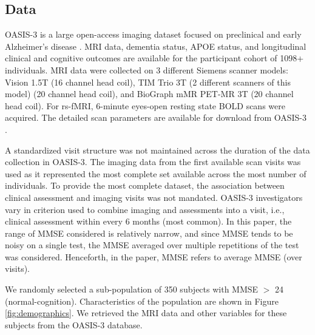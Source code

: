 \documentclass[review,3p,times,12pt,letterpaper]{elsarticle}
\newcommand{\dws}[1]{{\color{red} [#1]}}
\begin{document}
\subsection*{Data}
OASIS-3 is a large open-access imaging dataset focused on preclinical and early Alzheimer's disease \cite{lamontagne2019oasis, OASIS-3}. MRI data, dementia status, APOE status, and longitudinal clinical and cognitive outcomes are available for the participant cohort of 1098+ individuals. MRI data were collected on 3 different Siemens scanner models: Vision 1.5T (16 channel head coil), TIM Trio 3T (2 different scanners of this model) (20 channel head coil), and BioGraph mMR PET-MR 3T (20 channel head coil). For rs-fMRI, 6-minute eyes-open resting state BOLD scans were acquired. The detailed scan parameters are available for download from OASIS-3 \cite{lamontagne2019oasis, OASIS-3}.
 

A standardized visit structure was not maintained across the duration of the data collection in OASIS-3. The imaging data from the first available scan visits was used as it represented the most complete set available across the most number of individuals. 
To provide the most complete dataset, the association between clinical assessment and imaging visits was not mandated. OASIS-3 investigators vary in criterion used to combine imaging and assessments into a visit, i.e., clinical assessment within every 6 months (most common). 
In this paper, the range of MMSE considered is relatively narrow, and since MMSE tends to be noisy on a single test, the MMSE averaged over multiple repetitions of the test was considered. Henceforth, in the paper, MMSE refers to average MMSE (over visits).


We randomly selected a sub-population of 350 subjects with MMSE $>$ 24 (normal-cognition). Characteristics of the population are shown in Figure \ref{fig:demographics}. We retrieved the MRI data and other variables for these subjects from the OASIS-3 database.
\end{document}
